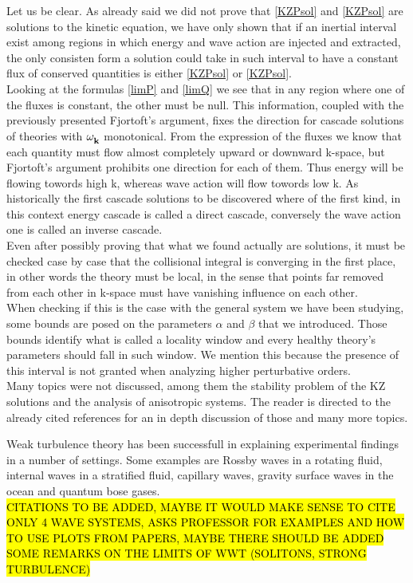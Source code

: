 Let us be clear. As already said we did not prove that \eqref{KZPsol} and \eqref{KZPsol} are solutions to the kinetic equation, we have only shown that if 
an inertial interval exist among regions in which energy and wave action are injected and extracted, the only consisten form a solution could take in such 
interval to have a constant flux of conserved quantities is either \eqref{KZPsol} or \eqref{KZPsol}. \\
Looking at the formulas \eqref{limP} and \eqref{limQ} we see that in any region where one of the fluxes is constant, the other must be null. This information, coupled 
with the previously presented Fjortoft's argument, fixes the direction for cascade solutions of theories with $\omega^{}_{\mathbf{k}}$ monotonical. From the expression of the fluxes 
we know that each quantity must flow almost completely upward or downward k-space, but Fjortoft's argument prohibits one direction for  each of them. Thus energy
will be flowing towords high k, whereas wave action will flow towords low k. As historically the first cascade solutions to be discovered where of the first kind, 
in this context energy cascade is called a direct cascade, conversely the wave action one is called an inverse cascade. \\

Even after possibly proving that what we found actually are solutions, it must be checked case by case that the collisional integral is converging in the first place,  in other words the theory must be local, in the sense that points far removed from each other in k-space must have vanishing influence on each other. \\
When checking if this is the case with the general system we have been studying, some bounds are posed on the parameters $\alpha$ and $\beta$ that we introduced.
Those bounds identify what is called a locality window and every healthy theory's parameters should fall in such window. We mention this because 
the presence of this interval is not granted when analyzing higher perturbative orders.\\ 
Many topics were not discussed, among them the stability problem of the KZ solutions and the analysis of anisotropic systems. The reader is directed to the 
already cited references for an in depth discussion of those and many more topics.

Weak turbulence theory has been successfull in explaining experimental findings in a number of settings. Some examples are Rossby waves in a rotating fluid, internal waves 
in a stratified fluid, capillary waves, gravity surface waves in the ocean and quantum bose gases. \\
\hl{CITATIONS TO BE ADDED, MAYBE IT WOULD MAKE SENSE TO CITE ONLY 4 WAVE SYSTEMS, ASKS PROFESSOR FOR EXAMPLES AND HOW 
TO USE PLOTS FROM PAPERS, MAYBE THERE SHOULD BE ADDED SOME REMARKS ON THE LIMITS OF WWT (SOLITONS, STRONG TURBULENCE)}
